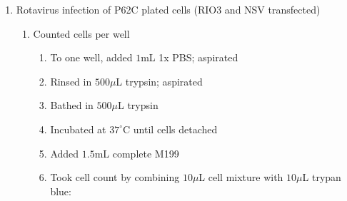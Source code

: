 \begin{enumerate}
	\item Rotavirus infection of P62C plated cells (RIO3 and NSV transfected)
		\begin{enumerate}
			\item Counted cells per well
				\begin{enumerate}
					\item To one well, added $1$mL 1x PBS; aspirated
					\item Rinsed in $500\mu$L trypsin; aspirated
					\item Bathed in $500\mu$L trypsin
					\item Incubated at $37^{\circ}$C until cells detached
					\item Added $1.5$mL complete M199
					\item Took cell count by combining $10\mu$L cell mixture with $10\mu$L trypan blue:
			

\end{enumerate}
\end{enumerate}
\end{enumerate}
